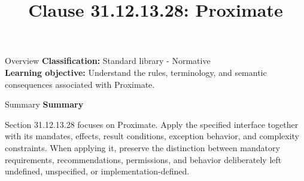 \documentclass[10pt,letterpaper]{article}
\title{Clause 31.12.13.28: Proximate}
\author{}
\date{}
\begin{document}
\maketitle
\begin{CornellOverviewBox}{Overview}
\textbf{Classification:} Standard library - Normative\\[2pt]
\textbf{Learning objective:} Understand the rules, terminology, and semantic consequences associated with Proximate.
\end{CornellOverviewBox}\begin{CornellSummaryBox}{Summary}
{\sffamily\bfseries\color{Accent} Summary}\par\vspace{3pt}Section 31.12.13.28 focuses on Proximate. Apply the specified interface together with its mandates, effects, result conditions, exception behavior, and complexity constraints. When applying it, preserve the distinction between mandatory requirements, recommendations, permissions, and behavior deliberately left undefined, unspecified, or implementation-defined.
\end{CornellSummaryBox}
\end{document}
